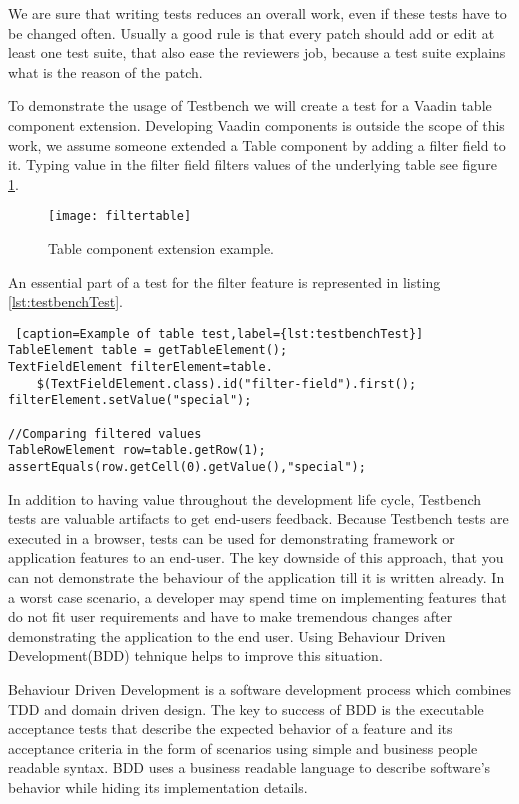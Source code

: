  We are sure that writing tests reduces an overall work,
 even if these tests have to be changed often.
 Usually a good rule is that every patch should add or edit at least one test suite, that
 also ease the reviewers job, because a test suite explains what is the reason of the patch. 
  
To demonstrate the usage of Testbench we will create a test for a Vaadin table
component extension. Developing Vaadin components is outside the scope of
this work, we assume someone extended a Table component by adding a filter field to
it. Typing value in the filter field filters values of the underlying table see
figure \ref{fig:filtertable}.
	\begin{figure}
	\centering
	\texttt{[image: filtertable]}
	\caption{Table component extension example.}
	\label{fig:filtertable}
	\end{figure}

An essential  part of a test for the filter feature is represented in listing
\ref{lst:testbenchTest}. 

 \lstset{style=a1listing}
  \begin{lstlisting} [caption=Example of table test,label={lst:testbenchTest}]
TableElement table = getTableElement();
TextFieldElement filterElement=table.
	$(TextFieldElement.class).id("filter-field").first();
filterElement.setValue("special");

//Comparing filtered values
TableRowElement row=table.getRow(1);
assertEquals(row.getCell(0).getValue(),"special");
  \end{lstlisting}

In addition to having value throughout the development life cycle,
Testbench tests are valuable artifacts to get end-users feedback.
Because Testbench tests are executed in a browser, tests can be used 
for demonstrating framework or application features to an end-user. The key
downside of this approach, that you can not demonstrate the behaviour of the
application till it is written already. In a worst case scenario, a developer
may spend time on implementing features that do not fit user requirements and
have to make tremendous changes after demonstrating the application to the end
user. Using Behaviour Driven Development(BDD) tehnique helps to improve this
situation.

Behaviour Driven Development is a software development process which combines
TDD and domain driven design. The key to success of BDD is the executable
acceptance tests that describe the expected behavior of a feature and its
acceptance criteria in the form of scenarios using simple and
business people readable syntax\cite{bddArticle}. BDD uses a business readable
language to describe software's behavior while hiding its implementation
details.

